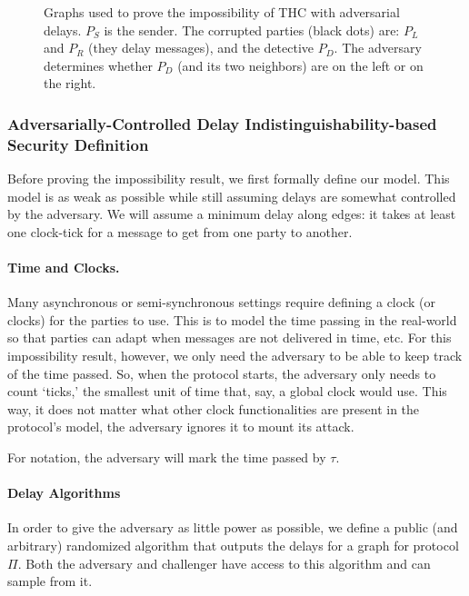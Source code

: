 \begin{figure}
	\caption{Graphs used to prove the impossibility of THC with adversarial delays. 
		$P_S$ is the sender.
		The corrupted parties (black dots) are: $P_L$ and $P_R$ (they delay messages), and the detective $P_D$. The adversary determines whether $P_D$ (and its two neighbors) are on the left or on the right.}
	\label{fig:imp}
\end{figure}



\subsubsection{Adversarially-Controlled Delay Indistinguishability-based Security Definition}
Before proving the impossibility result, we first formally define our model. This model is as weak as possible while still assuming delays are somewhat controlled by the adversary. We will assume a minimum delay along edges: it takes at least one clock-tick for a message to get from one party to another.

\paragraph{Time and Clocks.}
Many asynchronous or semi-synchronous settings require defining a clock (or clocks) for the parties to use. This is to model the time passing in the real-world so that parties can adapt when messages are not delivered in time, etc. For this impossibility result, however, we only need the adversary to be able to keep track of the time passed. So, when the protocol starts, the adversary only needs to count `ticks,' the smallest unit of time that, say, a global clock would use. This way, it does not matter what other clock functionalities are present in the protocol's model, the adversary ignores it to mount its attack.

For notation, the adversary will mark the time passed by $\tau$.

\paragraph{Delay Algorithms}
In order to give the adversary as little power as possible, we define a public (and arbitrary) randomized algorithm that outputs the delays for a graph for protocol $\Pi$. Both the adversary and challenger have access to this algorithm and can sample from it.

